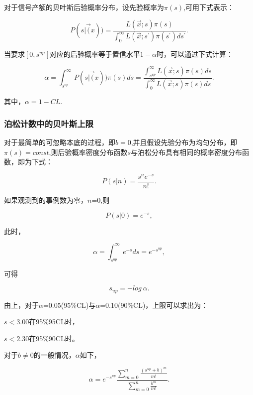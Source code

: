 对于信号产额的贝叶斯后验概率分布，设先验概率为$\pi (s)$,可用下式表示：

\begin{equation}\label{key}
P(s|\vec(x))= \frac{L(\vec{x};s)\pi(s)}{\int_{0}^{\infty}L(\vec{x};s^{'})\pi(s^{'})ds^{'}}.
\end{equation}

当要求$\left[0,s^{up}\left[$对应的后验概率等于置信水平$1-\alpha$时，可以通过下式计算：

\begin{equation}\label{key}
\alpha = \int_{s^{up}}^{\infty}P(s|\vec(x))\pi(s)ds=\frac{\int_{s^{up}}^{\infty}L(\vec{x};s)\pi(s)ds}{\int_{0}^{\infty}L(\vec{x};s)\pi(s)ds}.
\end{equation}

其中，$\alpha=1-CL$.

\subsubsection{泊松计数中的贝叶斯上限}

对于最简单的可忽略本底的过程，即$b=$0,并且假设先验分布为均匀分布，即$\pi(s)=const$,则后验概率密度分布函数$s$与泊松分布具有相同的概率密度分布函数，即为下式：

\begin{equation}\label{key}
P(s|n)=\frac{s^{n}e^{-s}}{n!}.
\end{equation}

如果观测到的事例数为零，$n$=0,则

\begin{equation}\label{key}
P(s|0)=e^{-s},
\end{equation}

此时，

\begin{equation}\label{key}
\alpha=\int_{s^{up}}^{\infty}e^{-s}ds=e^{-s^{up}},
\end{equation}

可得

\begin{equation}\label{key}
s_{up}=-log~\alpha.
\end{equation}

由上，对于$\alpha$=0.05(95$\%$CL)与$\alpha$=0.10(90$\%$CL)，上限可以求出为：

$s<3.00$在95$\%$95CL时，

$s<2.30$在95$\%$90CL时。

对于$b\neq 0$的一般情况，$\alpha$如下，

\begin{equation}\label{key}
\alpha=e^{-s^{up}}\frac{\sum_{m=0}^{n} \frac{(s^{up}+b)^{m}}{m!}}{\sum_{m=0}^{n} \frac{b^{m}}{m!}}.
\end{equation}

